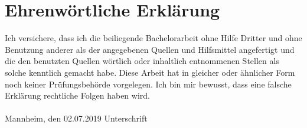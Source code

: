 \documentclass[a4paper, 11pt,titlepage,oneside,openany]{book}
\begin{document}
{}

\pagestyle{empty}

\newpage
\section*{Ehrenw\"ortliche Erkl\"arung}
Ich versichere, dass ich die beiliegende Bachelorarbeit ohne Hilfe Dritter
und ohne Benutzung anderer als der angegebenen Quellen und Hilfsmittel
angefertigt und die den benutzten Quellen w\"ortlich oder inhaltlich
entnommenen Stellen als solche kenntlich gemacht habe. Diese Arbeit
hat in gleicher oder \"ahnlicher Form noch keiner Pr\"ufungsbeh\"orde
vorgelegen. Ich bin mir bewusst, dass eine falsche Erkl\"arung rechtliche Folgen haben
wird.
\\
\\

\noindent
Mannheim, den 02.07.2019 \hspace{4cm} Unterschrift
\end{document}
